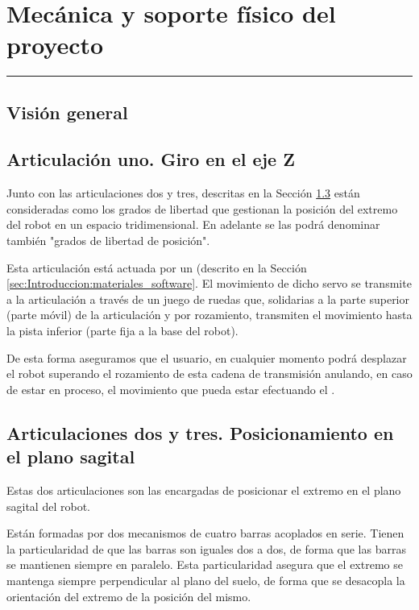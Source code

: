 \chapter{Mecánica y soporte físico del proyecto} \label{chap:Mecanica}
\hrule
\vspace{3mm}

\section{Visión general} \label{sec:Mecanica:vision_general}

\section{Articulación uno. Giro en el eje Z} \label{sec:Mecanica:articulacion_uno}
    Junto con las articulaciones dos y tres, descritas en la Sección \ref{sec:Mecanica:articulacion_dostres} están consideradas como los grados de libertad que gestionan la posición del extremo del robot en un espacio tridimensional. En adelante se las podrá denominar también "grados de libertad de posición".
    
    Esta articulación está actuada por un  (descrito en la Sección \ref{sec:Introduccion:materiales_software}. El movimiento de dicho servo se transmite a la articulación a través de un juego de ruedas que, solidarias a la parte superior (parte móvil) de la articulación y por rozamiento, transmiten el movimiento hasta la pista inferior (parte fija a la base del robot).
    
    De esta forma aseguramos que el usuario, en cualquier momento podrá desplazar el robot superando el rozamiento de esta cadena de transmisión anulando, en caso de estar en proceso, el movimiento que pueda estar efectuando el .

\section{Articulaciones dos y tres. Posicionamiento en el plano sagital} \label{sec:Mecanica:articulacion_dostres}
    Estas dos articulaciones son las encargadas de posicionar el extremo en el plano sagital del robot.
    
    Están formadas por dos mecanismos de cuatro barras acoplados en serie. Tienen la particularidad de que las barras son iguales dos a dos, de forma que las barras se mantienen siempre en paralelo. Esta particularidad asegura que el extremo se mantenga siempre perpendicular al plano del suelo, de forma que se desacopla la orientación del extremo de la posición del mismo.
    
